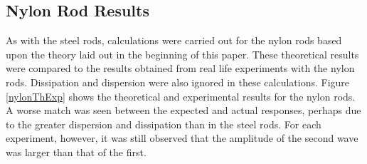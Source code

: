 \documentclass[11pt,letterpaper]{article}%
\begin{document}
\subsection{Nylon Rod Results}
\label{sect:nylonRodResults}

As with the steel rods, calculations were carried out for the nylon rods based upon the theory laid out in the beginning of this paper. These theoretical results were compared to the results obtained from real life experiments with the nylon rods. Dissipation and dispersion were also ignored in these calculations. Figure \ref{nylonThExp} shows the theoretical and experimental results for the nylon rods. A worse match was seen between the expected and actual responses, perhaps due to the greater dispersion and dissipation than in the steel rods. For each experiment, however, it was still observed that the amplitude of the second wave was larger than that of the first.
\end{document}
